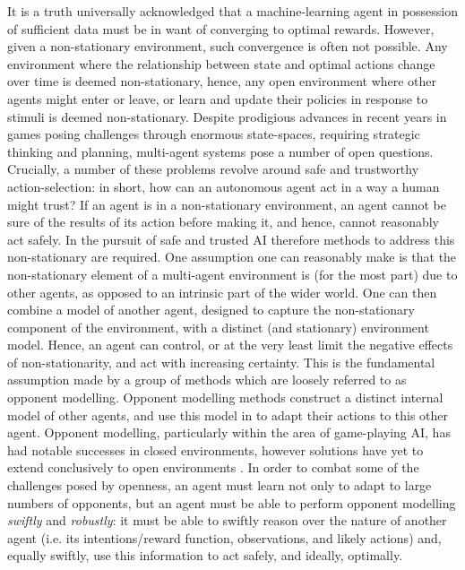 It is a truth universally acknowledged that a machine-learning agent in possession of sufficient data must be in want of converging to optimal rewards. However, given a non-stationary environment, such convergence is often not possible. Any environment where the relationship between state and optimal actions change over time is deemed non-stationary, hence, any open environment where other agents might enter or leave, or learn and update their policies in response to stimuli is deemed non-stationary. 
\newline \newline
Despite prodigious advances in recent years in games posing challenges through enormous state-spaces, requiring strategic thinking and planning, multi-agent systems pose a number of open questions. Crucially, a number of these problems revolve around safe and trustworthy action-selection: in short, how can an autonomous agent act in a way a human might trust? If an agent is in a non-stationary environment, an agent cannot be sure of the results of its action before making it, and hence, cannot reasonably act safely. In the pursuit of safe and trusted AI therefore methods to address this non-stationary are required. 
\newline \newline
One assumption one can reasonably make is that the non-stationary element of a multi-agent environment is (for the most part) due to other agents, as opposed to an intrinsic part of the wider world. One can then combine a model of another agent, designed to capture the non-stationary component of the environment, with a distinct (and stationary) environment model. Hence, an agent can control, or at the very least limit the negative effects of non-stationarity, and act with increasing certainty. This is the fundamental assumption made by a group of methods which are loosely referred to as opponent modelling. Opponent modelling methods construct a distinct internal model of other agents, and use this model in to adapt their actions to this other agent. 
\newline \newline
Opponent modelling, particularly within the area of game-playing AI, has had notable successes in closed environments, however solutions have yet to extend conclusively to open environments \cite{Albrecht_stone_2019}. In order to combat some of the challenges posed by openness, an agent must learn not only to adapt to large numbers of opponents, but an agent must be able to perform opponent modelling \textit{swiftly} and \textit{robustly}: it must be able to swiftly reason over the nature of another agent (i.e. its intentions/reward function, observations, and likely actions) and, equally swiftly, use this information to act safely, and ideally, optimally. 
